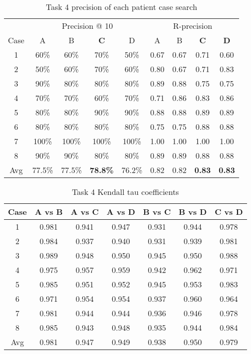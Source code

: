 \begin{table}[htbp] \footnotesize \center
\caption{Task 4 precision of each patient case search\label{tab:precision}}
\begin{tabular}{c c c c c c c c c}
    \toprule
    & \multicolumn{4}{c}{Precision @ 10} & \multicolumn{4}{c}{R-precision} \\
	\cmidrule(r){2-9}
	Case & A & B & \textbf{C} & D & A & B & \textbf{C} & \textbf{D} \\
    \midrule
	1 & 60\% & 60\% & 70\% & 50\% & 0.67 & 0.67 & 0.71 & 0.60 \\
	2 & 50\% & 60\% & 70\% & 60\% & 0.80 & 0.67 & 0.71 & 0.83 \\
	3 & 90\% & 80\% & 80\% & 80\% & 0.89 & 0.88 & 0.75 & 0.75 \\
	4 & 70\% & 70\% & 60\% & 70\% & 0.71 & 0.86 & 0.83 & 0.86 \\
	5 & 80\% & 80\% & 90\% & 90\% & 0.88 & 0.88 & 0.89 & 0.89 \\
	6 & 80\% & 80\% & 80\% & 80\% & 0.75 & 0.75 & 0.88 & 0.88 \\
	7 & 100\% & 100\% & 100\% & 100\% & 1.00 & 1.00 & 1.00 & 1.00 \\
	8 & 90\% & 90\% & 80\% & 80\% & 0.89 & 0.89 & 0.88 & 0.88 \\
    \midrule
	Avg & 77.5\% & 77.5\% & \textbf{78.8\%} & 76.2\% & 0.82 & 0.82 & \textbf{0.83} & \textbf{0.83} \\
	\bottomrule
\end{tabular}
\end{table}

\begin{table}[htbp] \footnotesize \center
\caption{Task 4 Kendall tau coefficients\label{tab:kendalltau}}
\begin{tabular}{c c c c c c c}
    \toprule
	Case & A vs B & A vs C & A vs D & B vs C & B vs D & C vs D \\
    \midrule
	1 & 0.981 & 0.941 & 0.947 & 0.931 & 0.944 & 0.978 \\
	2 & 0.984 & 0.937 & 0.940 & 0.931 & 0.939 & 0.981 \\
	3 & 0.989 & 0.948 & 0.950 & 0.945 & 0.950 & 0.988 \\
	4 & 0.975 & 0.957 & 0.959 & 0.942 & 0.962 & 0.971 \\
	5 & 0.985 & 0.951 & 0.952 & 0.945 & 0.953 & 0.983 \\
	6 & 0.971 & 0.954 & 0.954 & 0.937 & 0.960 & 0.964 \\
	7 & 0.981 & 0.944 & 0.944 & 0.936 & 0.946 & 0.978 \\
	8 & 0.985 & 0.943 & 0.948 & 0.935 & 0.944 & 0.984 \\
    \midrule
	Avg & 0.981 & 0.947 & 0.949 & 0.938 & 0.950 & 0.979 \\
	\bottomrule
\end{tabular}
\end{table}


